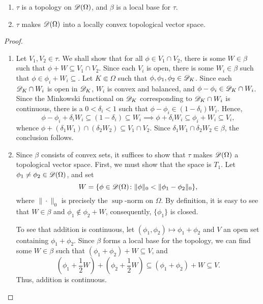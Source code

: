 \begin{theorem}
    \begin{enumerate}[label=(\alph*)]
        \item $\tau$ is a topology on $\mathscr{D}(\Omega)$, and $\beta$ is a local base for $\tau$.
        \item $\tau$ makes $\mathscr{D}(\Omega)$ into a locally convex topological vector space.
    \end{enumerate}
\end{theorem}
\begin{proof}
\begin{enumerate}[label=(\alph*)]
    \item Let $V_1,V_2\in\tau$. We shall show that for all $\phi\in V_1\cap V_2$, there is some $W\in\beta$ such that $\phi + W\subseteq V_1\cap V_2$. Since each $V_i$ is open, there is some $W_i\in\beta$ such that $\phi\in\phi_i + W_i\subseteq$. Let $K\Subset\Omega$ such that $\phi,\phi_1,\phi_2\in\mathscr{D}_K$. Since each $\mathscr{D}_K\cap W_i$ is open in $\mathscr{D}_K$, $W_i$ is convex and balanced, and $\phi - \phi_i\in\mathscr{D}_K\cap W_i$. Since the Minkowski functional on $\mathscr{D}_K$ corresponding to $\mathscr{D}_K\cap W_i$ is continuous, there is a $0 < \delta_i < 1$ such that $\phi - \phi_i\in (1 - \delta_i) W_i$. Hence, 
    \begin{equation*}
        \phi - \phi_i + \delta_i W_i\subseteq(1 - \delta_i)\subseteq W_i\implies\phi + \delta_i W_i\subseteq\phi_i + W_i\subseteq V_i,
    \end{equation*}
    whence $\phi + (\delta_1 W_1)\cap(\delta_2 W_2)\subseteq V_1\cap V_2$. Since $\delta_1W_1\cap\delta_2W_2\in\beta$, the conclusion follows.
    \item Since $\beta$ consists of convex sets, it suffices to show that $\tau$ makes $\mathscr{D}(\Omega)$ a topological vector space. First, we must show that the space is $T_1$. Let $\phi_1\ne\phi_2\in\mathscr{D}(\Omega)$, and set 
    \begin{equation*}
        W = \{\phi\in\mathscr{D}(\Omega)\colon\|\phi\|_0 < \|\phi_1 - \phi_2\|_0\},
    \end{equation*}
    where $\|\cdot\|_0$ is precisely the $\sup$-norm on $\Omega$. By definition, it is easy to see that $W\in\beta$ and $\phi_1\notin\phi_2 + W$, consequently, $\{\phi_1\}$ is closed.

    To see that addition is continuous, let $(\phi_1,\phi_2)\mapsto\phi_1 + \phi_2$ and $V$ an open set containing $\phi_1 + \phi_2$. Since $\beta$ forms a local base for the topology, we can find some $W\in\beta$ such that $(\phi_1 + \phi_2) + W\subseteq V$, and 
    \begin{equation*}
        \left(\phi_1 + \frac{1}{2}W\right) + \left(\phi_2 + \frac{1}{2}W\right)\subseteq (\phi_1 + \phi_2) + W\subseteq V.
    \end{equation*}
    Thus, addition is continuous.


\end{enumerate}
\end{proof}
